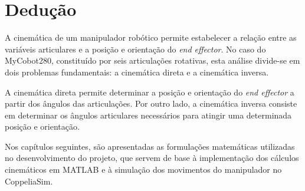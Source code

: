 
\section{Dedução}
\label{sec:deducao}

A cinemática de um manipulador robótico permite estabelecer a relação entre as variáveis articulares e a posição e orientação do \textit{end effector}. No caso do MyCobot280, constituído por seis articulações rotativas, esta análise divide-se em dois problemas fundamentais: a cinemática direta e a cinemática inversa.

A cinemática direta permite determinar a posição e orientação do \textit{end effector} a partir dos ângulos das articulações. Por outro lado, a cinemática inversa consiste em determinar os ângulos articulares necessários para atingir uma determinada posição e orientação.

Nos capítulos seguintes, são apresentadas as formulações matemáticas utilizadas no desenvolvimento do projeto, que servem de base à implementação dos cálculos cinemáticos em MATLAB e à simulação dos movimentos do manipulador no CoppeliaSim.
